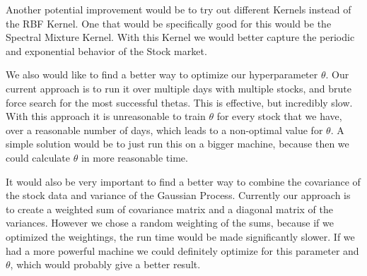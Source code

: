 \documentclass{article}
\begin{document}
Another potential improvement would be to try out different Kernels instead of the RBF Kernel.  One that would be specifically good for this would be the Spectral Mixture Kernel. \cite{spectral} With this Kernel we would better capture the periodic and exponential behavior of the Stock market.

We also would like to find a better way to optimize our hyperparameter $\theta$.  Our current approach is to run it over multiple days with multiple stocks, and brute force search for the most successful thetas.  This is effective, but incredibly slow.  With this approach it is unreasonable to train $\theta$ for every stock that we have, over a reasonable number of days, which leads to a non-optimal value for $\theta$.  A simple solution would be to just run this on a bigger machine, because then we could calculate $\theta$ in more reasonable time. 

It would also be very important to find a better way to combine the covariance of the stock data and variance of the Gaussian Process.  Currently our approach is to create a weighted sum of covariance matrix and a diagonal matrix of the variances. However we chose a random weighting of the sums, because if we optimized the weightings, the run time would be made significantly slower. If we had a more powerful machine we could definitely optimize for this parameter and $\theta$, which would probably give a better result.





\end{document}
